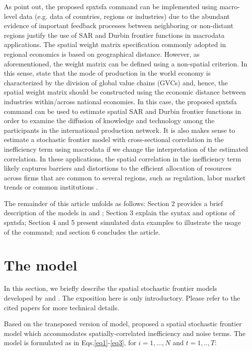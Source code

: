As \cite{orea2019new} point out, the proposed spxtsfa command can be implemented using macro-level data (e.g. data of countries, regions or industries) due to the abundant evidence of important feedback processes between neighboring or non-distant regions justify the use of SAR and Durbin frontier functions in macrodata applications. The spatial weight matrix specification commonly adopted in regional economics is based on geographical distance. However, as aforementioned, the weight matrix can be defined using a non-spatial criterion.  In this sense, \cite{liu2023industry} state that the mode of production in the world economy is characterized by the division of global value chains (GVCs) and, hence, the spatial weight matrix should be constructed using the economic distance between industries within/across national economies. In this case, the proposed spxtsfa command can be used to estimate spatial SAR and Durbin frontier functions in order to examine the diffusion of knowledge and technology among the participants in the international production network. It is also makes sense to estimate a stochastic frontier model with cross-sectional correlation in the inefficiency term using macrodata if we change the interpretation of the estimated correlation. In these applications, the spatial correlation in the inefficiency term likely captures barriers and distortions to the efficient allocation of resources across firms that are common to several regions, such as regulation, labor market trends or common institutions \citep[see e.g.][]{orea2023industry}.  


The remainder of this article unfolds as follows: Section 2 provides a brief description of the models in \cite{orea2019new} and \cite{galli2022spatial}; Section 3 explain the syntax and options of spxtsfa; Section 4 and 5 present simulated data examples to illustrate the usage of the command; and section 6 concludes the article.


\section{The model}\label{sec_method}
In this section, we briefly describe the spatial stochastic frontier models developed by \cite{orea2019new} and \cite{galli2022spatial}. The exposition here is only introductory. Please refer to the cited papers for more technical details.  

Based on the transposed version of \cite{wang2010estimating} model, \cite{orea2019new}  proposed a spatial stochastic frontier model which accommodates spatially-correlated inefficiency and noise terms. The model is formulated as in Eqs.\eqref{eq1}-\eqref{eq3}, for $i=1,...,N$ and $t=1,..,T$:

